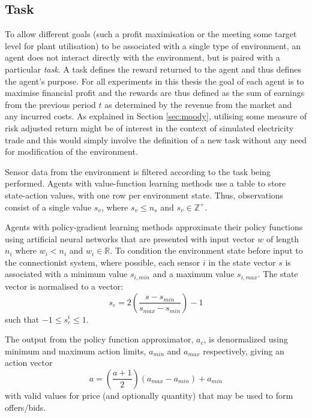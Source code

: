 \subsection{Task}
To allow different goals (such a profit maximisation or the
meeting some target level for plant utilisation) to be associated with a single
type of environment, an agent does not interact directly with the environment,
but is paired with a particular \textit{task}. A task defines the
reward returned to the agent and thus defines the agent's purpose.  For all
experiments in this thesis the goal of each agent is to maximise
financial profit and the rewards are thus defined as the sum of earnings from
the previous period $t$ as determined by the revenue from the market and any
incurred costs.  As explained in Section \ref{sec:moody}, utilising some
measure of risk adjusted return might be of interest in the context of
simulated electricity trade and this would simply involve the definition of a
new task without any need for modification of the environment.

Sensor data from the environment is filtered according to the task
being performed.  Agents with value-function learning methods use a table to
store state-action values, with one row per environment state.  Thus, observations
consist of a single value $s_v$, where $s_v \leq n_s$ and $s_v \in
\mathbb{Z}^+$.

Agents with policy-gradient learning methods approximate their policy
functions using artificial neural networks that are presented with input vector
$w$ of length $n_i$ where $w_i < n_i$ and $w_i \in \mathbb{R}$.  To condition
the environment state before input to the connectionist system, where possible,
each sensor $i$ in the state vector $s$ is associated with a minimum value
$s_{i,min}$ and a maximum value $s_{i,max}$.   The state vector is normalised
to a vector:
\begin{equation}
s_c = 2\left(\frac{s - s_{min}}{s_{max} - s_{min}}\right) - 1
\end{equation}
such that $-1 \leq s_c^i \leq 1$.

The output from the policy function approximator, $a_c$, is denormalized using
minimum and maximum action limits, $a_{min}$ and $a_{max}$ respectively, giving
an action vector
\begin{equation}
a = \left(\frac{a + 1}{2}\right)(a_{max} - a_{min}) + a_{min}
\end{equation}
with valid values for price (and optionally quantity) that may be used to form
offers/bids.

